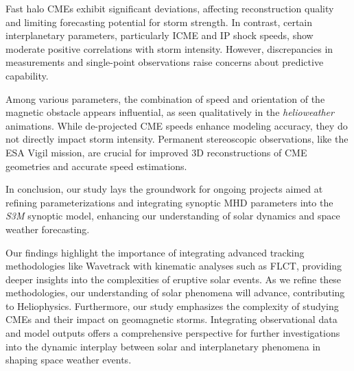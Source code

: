 Fast halo CMEs exhibit significant deviations, affecting reconstruction quality and limiting forecasting potential for storm strength. In contrast, certain interplanetary parameters, particularly ICME and IP shock speeds, show moderate positive correlations with storm intensity. However, discrepancies in measurements and single-point observations raise concerns about predictive capability.

Among various parameters, the combination of speed and orientation of the magnetic obstacle appears influential, as seen qualitatively in the \textit{helioweather} animations. While de-projected CME speeds enhance modeling accuracy, they do not directly impact storm intensity. Permanent stereoscopic observations, like the ESA Vigil mission, are crucial for improved 3D reconstructions of CME geometries and accurate speed estimations.

In conclusion, our study lays the groundwork for ongoing projects aimed at refining parameterizations and integrating synoptic MHD parameters into the \textit{S3M} synoptic model, enhancing our understanding of solar dynamics and space weather forecasting.

Our findings highlight the importance of integrating advanced tracking methodologies like Wavetrack with kinematic analyses such as FLCT, providing deeper insights into the complexities of eruptive solar events. As we refine these methodologies, our understanding of solar phenomena will advance, contributing to Heliophysics.
Furthermore, our study emphasizes the complexity of studying CMEs and their impact on geomagnetic storms. Integrating observational data and model outputs offers a comprehensive perspective for further investigations into the dynamic interplay between solar and interplanetary phenomena in shaping space weather events.
